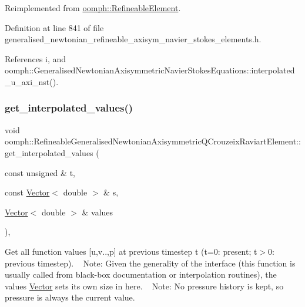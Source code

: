 Reimplemented from \hyperlink{classoomph_1_1RefineableElement_ad9a4f92880668a2373326d8306365c43}{oomph\+::\+Refineable\+Element}.



Definition at line 841 of file generalised\+\_\+newtonian\+\_\+refineable\+\_\+axisym\+\_\+navier\+\_\+stokes\+\_\+elements.\+h.



References i, and oomph\+::\+Generalised\+Newtonian\+Axisymmetric\+Navier\+Stokes\+Equations\+::interpolated\+\_\+u\+\_\+axi\+\_\+nst().

\mbox{\label{classoomph_1_1RefineableGeneralisedNewtonianAxisymmetricQCrouzeixRaviartElement_a5b7210597de67dcdb363897539109464}} 
\subsubsection{\texorpdfstring{get\+\_\+interpolated\+\_\+values()}{get\_interpolated\_values()}\hspace{0.1cm}{\footnotesize\ttfamily [2/2]}}
{\footnotesize\ttfamily void oomph\+::\+Refineable\+Generalised\+Newtonian\+Axisymmetric\+Q\+Crouzeix\+Raviart\+Element\+::get\+\_\+interpolated\+\_\+values (\begin{DoxyParamCaption}\item[{const unsigned \&}]{t,  }\item[{const \hyperlink{classoomph_1_1Vector}{Vector}$<$ double $>$ \&}]{s,  }\item[{\hyperlink{classoomph_1_1Vector}{Vector}$<$ double $>$ \&}]{values }\end{DoxyParamCaption})\hspace{0.3cm}{\ttfamily [inline]}, {\ttfamily [virtual]}}



Get all function values \mbox{[}u,v..,p\mbox{]} at previous timestep t (t=0\+: present; t$>$0\+: previous timestep). ~\newline
 Note\+: Given the generality of the interface (this function is usually called from black-\/box documentation or interpolation routines), the values \hyperlink{classoomph_1_1Vector}{Vector} sets its own size in here. ~\newline
Note\+: No pressure history is kept, so pressure is always the current value. 



